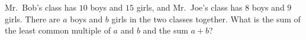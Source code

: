 Mr.\ Bob's class has $10$ boys and $15$ girls, and Mr.\ Joe's class has $8$ boys and $9$ girls. There are $a$ boys and $b$ girls in the two classes together. What is the sum of the least common multiple of $a$ and $b$ and the sum $a+b$?
